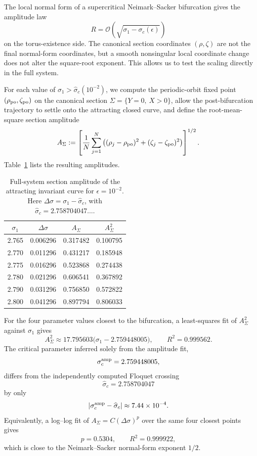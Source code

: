 \documentclass[11pt]{amsart}
\theoremstyle{remark}
\begin{document}
The local normal form of a supercritical Neimark--Sacker bifurcation gives
the amplitude law
\[
 R=\mathcal{O}\!\left(
 \sqrt{\sigma_1-\sigma_c(\epsilon)}
 \right)
\]
on the torus-existence side.  The canonical section coordinates \((\rho,\zeta)\) are not the final
normal-form coordinates, but a smooth nonsingular local coordinate change
does not alter the square-root exponent.  This allows us to test the scaling
directly in the full system.

For each value of \(\sigma_1>\widehat{\sigma}_c(10^{-2})\), we compute the
periodic-orbit fixed point
\((\rho_{\rm po},\zeta_{\rm po})\) on the canonical section
\(\Sigma=\{Y=0,\ X>0\}\), allow the post-bifurcation trajectory to settle
onto the attracting closed curve, and define the root-mean-square section
amplitude
\begin{equation}\label{eq:section-amplitude}
 A_\Sigma
 :=
 \left[
 \frac1N\sum_{j=1}^N
 \left(
  (\rho_j-\rho_{\rm po})^2+
  (\zeta_j-\zeta_{\rm po})^2
 \right)
 \right]^{1/2} .
\end{equation}
Table~\ref{tab:torus-amplitude-scaling} lists the resulting amplitudes.

\begin{table}[t]
\centering
\caption{Full-system section amplitude of the attracting invariant curve for
\(\epsilon=10^{-2}\).  Here
\(\Delta\sigma=\sigma_1-\widehat{\sigma}_c\), with
\(\widehat{\sigma}_c=2.758704047\ldots\).}
\label{tab:torus-amplitude-scaling}
\begin{tabular}{cccc}
\hline
\(\sigma_1\) & \(\Delta\sigma\) & \(A_\Sigma\) & \(A_\Sigma^2\)\\
\hline
2.765 & 0.006296 & 0.317482 & 0.100795\\
2.770 & 0.011296 & 0.431217 & 0.185948\\
2.775 & 0.016296 & 0.523868 & 0.274438\\
2.780 & 0.021296 & 0.606541 & 0.367892\\
2.790 & 0.031296 & 0.756850 & 0.572822\\
2.800 & 0.041296 & 0.897794 & 0.806033\\
\hline
\end{tabular}
\end{table}

For the four parameter values closest to the bifurcation, a least-squares
fit of \(A_\Sigma^2\) against \(\sigma_1\) gives
\begin{equation}\label{eq:amplitude-linear-fit}
 A_\Sigma^2
 \approx 17.795603
 \bigl(\sigma_1-2.759448005\bigr),
 \qquad R^2=0.999562.
\end{equation}
The critical parameter inferred solely from the amplitude fit,
\[
 \sigma_c^{\rm amp}=2.759448005,
\]
differs from the independently computed Floquet crossing
\[
 \widehat{\sigma}_c=2.758704047
\]
by only
\[
 \left|\sigma_c^{\rm amp}-\widehat{\sigma}_c\right|
 \approx 7.44\times10^{-4}.
\]
Equivalently, a log--log fit of
\(A_\Sigma=C(\Delta\sigma)^p\) over the same four closest points gives
\[
 p=0.5304,
 \qquad
 R^2=0.999922,
\]
which is close to the Neimark--Sacker normal-form exponent \(1/2\).
\end{document}
